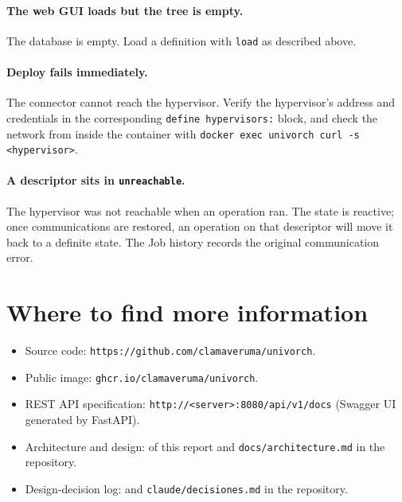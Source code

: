 \paragraph{The web GUI loads but the tree is empty.}
The database is empty. Load a definition with \texttt{load} as
described above.

\paragraph{Deploy fails immediately.}
The connector cannot reach the hypervisor. Verify the hypervisor's
address and credentials in the corresponding \texttt{define
hypervisors:} block, and check the network from inside the
container with \texttt{docker exec univorch curl -s
<hypervisor>}.

\paragraph{A descriptor sits in \texttt{unreachable}.}
The hypervisor was not reachable when an operation ran. The state
is reactive; once communications are restored, an operation on
that descriptor will move it back to a definite state. The Job
history records the original communication error.

\section{Where to find more information}

\begin{itemize}
  \item Source code: \texttt{https://github.com/clamaveruma/univorch}.
  \item Public image: \texttt{ghcr.io/clamaveruma/univorch}.
  \item REST API specification: \texttt{http://<server>:8080/api/v1/docs}
        (Swagger UI generated by FastAPI).
  \item Architecture and design:  of this report
        and \texttt{docs/architecture.md} in the repository.
  \item Design-decision log:  and
        \texttt{claude/decisiones.md} in the repository.
\end{itemize}
